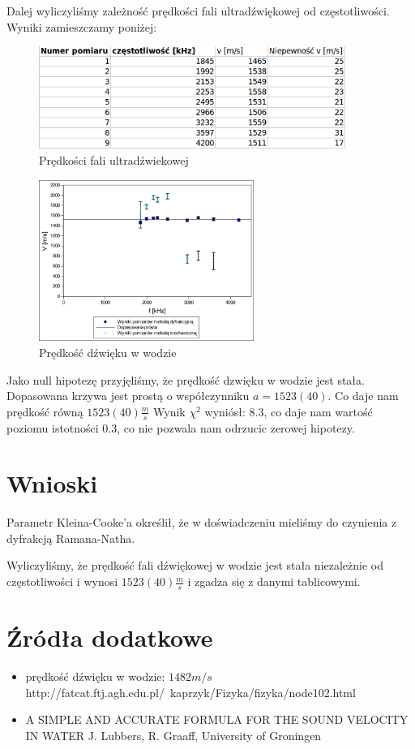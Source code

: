 \documentclass[a4paper,12pt]{article}
\begin{document}
Dalej wyliczyliśmy zależność prędkości fali ultradźwiękowej od częstotliwości. Wyniki zamieszczamy poniżej: 

\begin{figure} [H]
  \begin{center}
    \includegraphics[width = 10cm]{tab7.png}
    \caption{Prędkości fali ultradźwiekowej}
  \end{center}
\end{figure}


\begin{figure} [H]
  \begin{center}
    \includegraphics[width = 7cm]{wykres5.png}
    \caption{Prędkość dźwięku w wodzie}
  \end{center}
\end{figure}


Jako null hipotezę przyjęliśmy, że prędkość dzwięku w wodzie jest stała. Dopasowana krzywa jest prostą o współczynniku $a=1523(40)$. Co daje nam prędkość równą $1523(40) \frac{m}{s}$
Wynik $\chi^2$ wyniósł: 8.3, co daje nam wartość poziomu istotności 0.3, co nie pozwala nam odrzucic zerowej hipotezy.

\section{Wnioski}


Parametr Kleina-Cooke'a określił, że w doświadczeniu mieliśmy do czynienia z dyfrakcją Ramana-Natha. 

Wyliczyliśmy, że prędkość fali dźwiękowej w wodzie jest stała niezależnie od częstotliwości i wynosi $1523(40) \frac{m}{s}$ i zgadza się z danymi tablicowymi.


\section {Źródła dodatkowe}
  
 \begin{itemize}
   \item prędkość dźwięku w wodzie: $ 1482 m/s$ \\ http://fatcat.ftj.agh.edu.pl/~kaprzyk/Fizyka/fizyka/node102.html
   \item A SIMPLE AND ACCURATE FORMULA FOR THE SOUND VELOCITY IN WATER	J. Lubbers, R. Graaff, University of Groningen
   
 \end{itemize}
\end{document}
